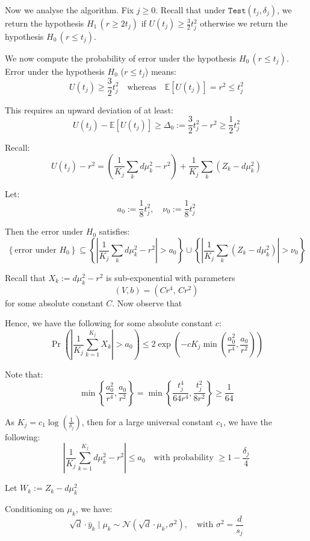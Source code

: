 Now we analyse the algorithm. Fix $j\geq 0$. Recall that under $\texttt{Test}(t_j,\delta_j)$, we return the hypothesis  $H_1 \, (r \geq 2t_j)$ if $U(t_j) \geq \frac{3}{2} t_j^2$ otherwise we return the hypothesis $H_0\, (r \leq t_j)$. 

We now compute the probability of error under the hypothesis $H_0\, (r \leq t_j)$. Error under the hypothesis $H_0$ ($r \leq t_j$) means:
\[
U(t_j) \geq \frac{3}{2} t_j^2 
\quad \text{whereas} \quad 
\mathbb{E}[U(t_j)] = r^2 \leq t_j^2
\]

This requires an upward deviation of at least:
\[
U(t_j) - \mathbb{E}[U(t_j)] \geq \Delta_0 := \frac{3}{2} t_j^2 - r^2 \geq \frac{1}{2} t_j^2
\]


Recall:
\[
U(t_j) - r^2 = \left( \frac{1}{K_j} \sum_k d\mu_k^2 - r^2 \right) + \frac{1}{K_j} \sum_k (Z_k - d\mu_k^2)
\]

Let:
\[
a_0 := \frac{1}{8} t_j^2, \quad \nu_0 := \frac{1}{8} t_j^2
\]

Then the error under $H_0$ satisfies:
\[
\left\{ \text{error under } H_0 \right\} 
\subseteq \left\{ \left| \frac{1}{K_j} \sum_k d\mu_k^2 - r^2 \right| >a_0 \right\}
\cup \left\{ \left| \frac{1}{K_j} \sum_k (Z_k - d\mu_k^2) \right| > \nu_0 \right\}
\]

\bigskip

Recall that $X_k := d \mu_k^2 - r^2$ is sub-exponential with parameters
\[
(V, b) = \left( C r^4, \, C r^2 \right)
\]
for some absolute constant $C$. Now observe that 

Hence, we have the following for some absolute constant $c$:
\[
\Pr\left( \left| \frac{1}{K_j} \sum_{k=1}^{K_j} X_k \right| > a_0 \right) 
\leq 2 \exp\left( -cK_j \min\left( \frac{a_0^2}{r^4}, \frac{a_0}{r^2} \right) \right)
\]

Note that:
\[
\min\left\{ \frac{a_0^2}{r^4}, \frac{a_0}{r^2} \right\} =\min\left\{ \frac{t_j^4}{64r^4}, \frac{t_j^2}{8r^2} \right\} \geq \frac{1}{64}
\]

As $K_j = c_1 \log \left( \frac{1}{\delta_j} \right)$, then for a large universal constant $c_1$, we have the following:
\[
\left| \frac{1}{K_j} \sum_{k=1}^{K_j} d\mu_k^2 - r^2 \right| 
\leq a_0 \quad \text{with probability } \geq 1 - \frac{\delta_j}{4}
\]

Let $W_k := Z_k - d\mu_k^2$

Conditioning on $\mu_k$, we have:
\[
\sqrt{d} \cdot \bar{y}_k \mid \mu_k \sim \mathcal{N}(\sqrt{d}\cdot\mu_k, \sigma^2), \quad \text{with } \sigma^2 = \frac{d}{s_j}
\]

